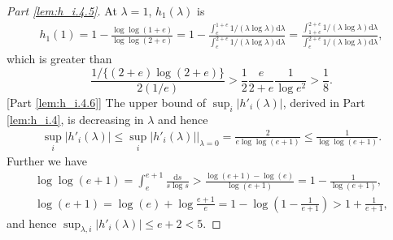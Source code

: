 \documentclass[preprint,11pt]{imsart}
\numberwithin{equation}{section}
\theoremstyle{plain}
\theoremstyle{definition}
\theoremstyle{remark}
\newcommand{\rd}{\mathrm{d}}
\begin{document}
\begin{proof}
 [Part \ref{lem:h_i.4.5}] At $\lambda=1$, $h_1(\lambda)$ is
 \begin{align*}
  h_1(1)=1-\frac{\log\log(1+e)}{\log\log(2+e)} =
  1-\frac{\int_e^{1+e} 1/(\lambda\log \lambda)\rd \lambda}{\int_e^{2+e} 1/(\lambda\log \lambda)\rd \lambda} 
  =\frac{\int_{1+e}^{2+e} 1/(\lambda\log \lambda)\rd \lambda}{\int_e^{2+e} 1/(\lambda\log \lambda)\rd \lambda},
\end{align*}
which is greater than
\begin{equation*}
\frac{1/\{(2+e)\log(2+e)\}}{2(1/e)} >\frac{1}{2}\frac{e}{2+e}\frac{1}{\log e^2} >\frac{1}{8}.
\end{equation*}
[Part \ref{lem:h_i.4.6}]
 The upper bound of $\sup_i|h'_i(\lambda)|$, derived in Part \ref{lem:h_i.4},
 is decreasing in $\lambda$ and hence
 \begin{align*}
  \sup_i|h'_i(\lambda)|\leq \sup_i|h'_i(\lambda)|\big|_{\lambda=0}=\frac{2}{e\log\log(e+1)}\leq \frac{1}{\log\log(e+1)}.
 \end{align*}
 Further we have
 \begin{gather*}
  \log\log(e+1)=\int_e^{e+1}\frac{\rd s}{s\log s} >\frac{\log(e+1)-\log(e)}{\log(e+1)}
=1-\frac{1}{\log(e+1)}, \\
\log(e+1)=\log(e)+\log\frac{e+1}{e}=1-\log\left(1-\frac{1}{e+1}\right)>1+\frac{1}{e+1} ,
 \end{gather*}
and hence $ \sup_{\lambda,i}|h'_i(\lambda)|\leq e+2<5$.


\end{proof}
\end{document}
